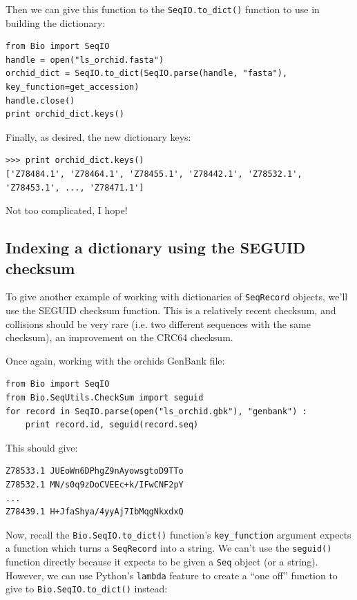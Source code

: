 \documentclass{report}
\begin{document}
\noindent Then we can give this function to the \verb|SeqIO.to_dict()| function to use in building the dictionary:

\begin{verbatim}
from Bio import SeqIO
handle = open("ls_orchid.fasta")
orchid_dict = SeqIO.to_dict(SeqIO.parse(handle, "fasta"), key_function=get_accession)
handle.close()
print orchid_dict.keys()
\end{verbatim}

\noindent Finally, as desired, the new dictionary keys:

\begin{verbatim}
>>> print orchid_dict.keys()
['Z78484.1', 'Z78464.1', 'Z78455.1', 'Z78442.1', 'Z78532.1', 'Z78453.1', ..., 'Z78471.1']
\end{verbatim}

\noindent Not too complicated, I hope!

\subsection{Indexing a dictionary using the SEGUID checksum}

To give another example of working with dictionaries of \verb|SeqRecord| objects, we'll use the SEGUID checksum function.  This is a relatively recent checksum, and collisions should be very rare (i.e. two different sequences with the same checksum), an improvement on the CRC64 checksum.

Once again, working with the orchids GenBank file:

\begin{verbatim}
from Bio import SeqIO
from Bio.SeqUtils.CheckSum import seguid
for record in SeqIO.parse(open("ls_orchid.gbk"), "genbank") :
    print record.id, seguid(record.seq)
\end{verbatim}

\noindent This should give:

\begin{verbatim}
Z78533.1 JUEoWn6DPhgZ9nAyowsgtoD9TTo
Z78532.1 MN/s0q9zDoCVEEc+k/IFwCNF2pY
...
Z78439.1 H+JfaShya/4yyAj7IbMqgNkxdxQ
\end{verbatim}

Now, recall the \verb|Bio.SeqIO.to_dict()| function's \verb|key_function| argument expects a function which turns a \verb|SeqRecord| into a string.  We can't use the \verb|seguid()| function directly because it expects to be given a \verb|Seq| object (or a string).  However, we can use Python's \verb|lambda| feature to create a ``one off'' function to give to \verb|Bio.SeqIO.to_dict()| instead:
\end{document}
